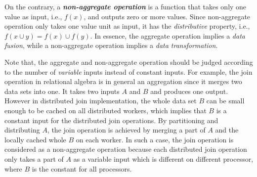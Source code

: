 On the contrary, a \emph{\textbf{non-aggregate operation}} is a function that takes only one value as input, i.e., $f(x)$, and outputs zero or more values. Since non-aggregate operation only takes one value unit as input, it has the \emph{distributive} property, i.e., $f(x\cup y)=f(x)\cup f(y)$. In essence, the aggregate operation implies a \emph{data fusion}, while a non-aggregate operation implies a \emph{data transformation}.


Note that, the aggregate and non-aggregate operation should be judged according to the number of \emph{variable} inputs instead of constant inputs. For example, the join operation in relational algebra is in general an aggregation since it merges two data sets into one. It takes two inputs $A$ and $B$ and produces one output. However in distributed join implementation, the whole data set $B$ can be small enough to be cached on all distributed workers, which implies that $B$ is a constant input for the distributed join operations. By partitioning and distributing $A$, the join operation is achieved by merging a part of $A$ and the locally cached whole $B$ on each worker. In such a case, the join operation is considered as a non-aggregate operation because each distributed join operation only takes a part of $A$ as a variable input which is different on different processor, where $B$ is the constant for all processors.


